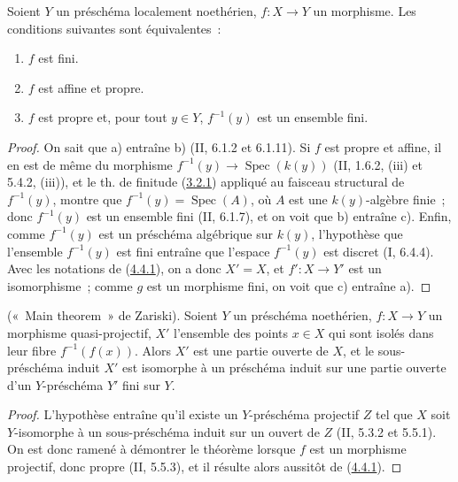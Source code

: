 \begin{proposition}[4.4.2]
\label{III.4.4.2-fr}
Soient $Y$ un préschéma localement noethérien, $f:X\to Y$ un morphisme. Les
conditions suivantes sont équivalentes~:
\begin{enumerate}
\item[a)] $f$ est fini.
\item[b)] $f$ est affine et propre.
\item[c)] $f$ est propre et, pour tout $y\in Y$, $f^{-1}(y)$ est un ensemble
fini.
\end{enumerate}
\end{proposition}

\begin{proof}
On sait que a) entraîne b) (II, 6.1.2 et 6.1.11). Si $f$ est propre et affine,
il en est de même du morphisme
$f^{-1}(y)\to\operatorname{Spec}(k(y))$ (II, 1.6.2, (iii) et 5.4.2, (iii)),
et le th. de finitude (\hyperref[III.3.2.1-fr]{3.2.1}) appliqué au faisceau
structural de $f^{-1}(y)$, montre que $f^{-1}(y)=\operatorname{Spec}(A)$, où
$A$ est une $k(y)$-algèbre finie~; donc $f^{-1}(y)$ est un ensemble fini
(II, 6.1.7), et on voit que b) entraîne c). Enfin, comme $f^{-1}(y)$ est un
préschéma algébrique sur $k(y)$, l'hypothèse que l'ensemble $f^{-1}(y)$ est
fini entraîne que l'espace $f^{-1}(y)$ est discret (I, 6.4.4). Avec les
notations de (\hyperref[III.4.4.1-fr]{4.4.1}), on a donc $X'=X$, et
$f':X\to Y'$ est un isomorphisme~; comme $g$ est un morphisme fini, on voit
que c) entraîne a).
\end{proof}

\begin{theorem}[4.4.3]
\label{III.4.4.3-fr}
\textnormal{(«~Main theorem~» de Zariski).}
Soient $Y$ un préschéma noethérien, $f:X\to Y$ un morphisme quasi-projectif,
$X'$ l'ensemble des points $x\in X$ qui sont isolés dans leur fibre
$f^{-1}(f(x))$. Alors $X'$ est une partie ouverte de $X$, et le
sous-préschéma induit $X'$ est isomorphe à un préschéma induit sur une partie
ouverte d'un $Y$-préschéma $Y'$ fini sur $Y$.
\end{theorem}

\begin{proof}
L'hypothèse entraîne qu'il existe un $Y$-préschéma projectif $Z$ tel que $X$
soit $Y$-isomorphe à un sous-préschéma induit sur un ouvert de $Z$
(II, 5.3.2 et 5.5.1). On est donc ramené à démontrer le théorème lorsque $f$
est un morphisme projectif, donc propre (II, 5.5.3), et il résulte alors
aussitôt de (\hyperref[III.4.4.1-fr]{4.4.1}).
\end{proof}

